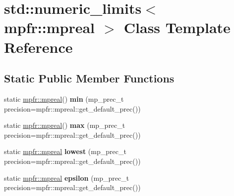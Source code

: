 \hypertarget{classstd_1_1numeric__limits_3_01mpfr_1_1mpreal_01_4}{}\section{std\+:\+:numeric\+\_\+limits$<$ mpfr\+:\+:mpreal $>$ Class Template Reference}
\label{classstd_1_1numeric__limits_3_01mpfr_1_1mpreal_01_4}
\subsection*{Static Public Member Functions}
\begin{DoxyCompactItemize}
\item 
\mbox{\label{classstd_1_1numeric__limits_3_01mpfr_1_1mpreal_01_4_ae26e5f5575ce3fcdc7571353d5943447}} 
static \hyperlink{classmpfr_1_1mpreal}{mpfr\+::mpreal}() {\bfseries min} (mp\+\_\+prec\+\_\+t precision=mpfr\+::mpreal\+::get\+\_\+default\+\_\+prec())
\item 
\mbox{\label{classstd_1_1numeric__limits_3_01mpfr_1_1mpreal_01_4_af3b5798dea70eba7566b8558177c5cb7}} 
static \hyperlink{classmpfr_1_1mpreal}{mpfr\+::mpreal}() {\bfseries max} (mp\+\_\+prec\+\_\+t precision=mpfr\+::mpreal\+::get\+\_\+default\+\_\+prec())
\item 
\mbox{\label{classstd_1_1numeric__limits_3_01mpfr_1_1mpreal_01_4_afe87477420320b20ef726e383e06a950}} 
static \hyperlink{classmpfr_1_1mpreal}{mpfr\+::mpreal} {\bfseries lowest} (mp\+\_\+prec\+\_\+t precision=mpfr\+::mpreal\+::get\+\_\+default\+\_\+prec())
\item 
\mbox{\label{classstd_1_1numeric__limits_3_01mpfr_1_1mpreal_01_4_ac2f7a8222ef4b03518ad0a3e247b0ff6}} 
static \hyperlink{classmpfr_1_1mpreal}{mpfr\+::mpreal} {\bfseries epsilon} (mp\+\_\+prec\+\_\+t precision=mpfr\+::mpreal\+::get\+\_\+default\+\_\+prec())
\item 
\mbox{\label{classstd_1_1numeric__limits_3_01mpfr_1_1mpreal_01_4_af8fc7c71cc65d48e85827cf41113a7e0}} 

\end{DoxyCompactItemize}
